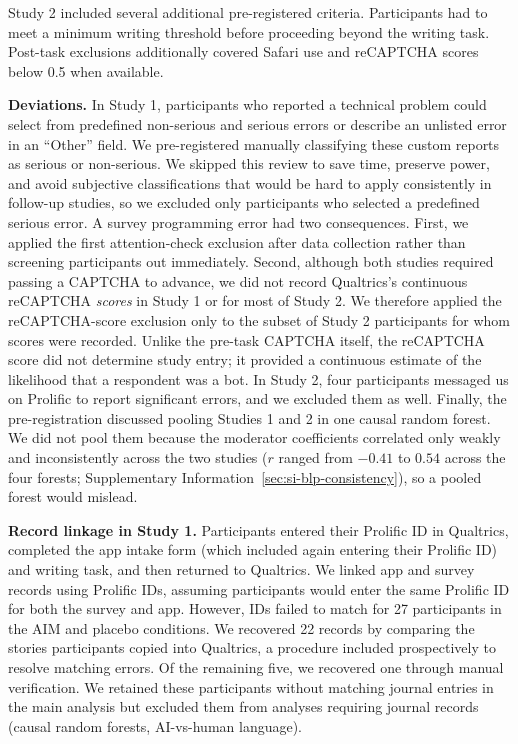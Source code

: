 \documentclass[11pt]{article}
\begin{document}
Study 2 included several additional pre-registered criteria. Participants had to meet a minimum writing threshold before proceeding beyond the writing task. Post-task exclusions additionally covered Safari use and reCAPTCHA scores below 0.5 when available.

\textbf{Deviations.} In Study 1, participants who reported a technical problem could select from predefined non-serious and serious errors or describe an unlisted error in an ``Other'' field. We pre-registered manually classifying these custom reports as serious or non-serious. We skipped this review to save time, preserve power, and avoid subjective classifications that would be hard to apply consistently in follow-up studies, so we excluded only participants who selected a predefined serious error. A survey programming error had two consequences. First, we applied the first attention-check exclusion after data collection rather than screening participants out immediately. Second, although both studies required passing a CAPTCHA to advance, we did not record Qualtrics's continuous reCAPTCHA \emph{scores} in Study 1 or for most of Study 2. We therefore applied the reCAPTCHA-score exclusion only to the subset of Study 2 participants for whom scores were recorded. Unlike the pre-task CAPTCHA itself, the reCAPTCHA score did not determine study entry; it provided a continuous estimate of the likelihood that a respondent was a bot. In Study 2, four participants messaged us on Prolific to report significant errors, and we excluded them as well. Finally, the pre-registration discussed pooling Studies 1 and 2 in one causal random forest. We did not pool them because the moderator coefficients correlated only weakly and inconsistently across the two studies ($r$ ranged from $-0.41$ to $0.54$ across the four forests; Supplementary Information~\ref{sec:si-blp-consistency}), so a pooled forest would mislead.




\textbf{Record linkage in Study 1.} Participants entered their Prolific ID in Qualtrics, completed the app intake form (which included again entering their Prolific ID) and writing task, and then returned to Qualtrics. We linked app and survey records using Prolific IDs, assuming participants would enter the same Prolific ID for both the survey and app. However, IDs failed to match for 27 participants in the AIM and placebo conditions. We recovered 22 records by comparing the stories participants copied into Qualtrics, a procedure included prospectively to resolve matching errors. Of the remaining five, we recovered one through manual verification. We retained these participants without matching journal entries in the main analysis but excluded them from analyses requiring journal records (causal random forests, AI-vs-human language).
\end{document}
